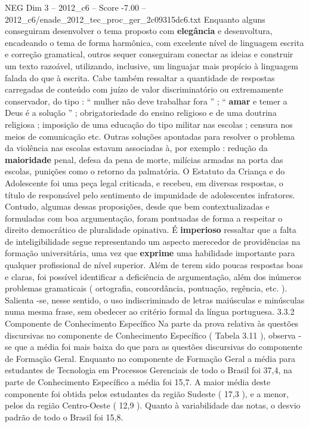 \begin{textsample}{NEG Dim 3 – 2012\_c6 – Score -7.00 – 2012\_c6/enade\_2012\_tec\_proc\_ger\_2c09315dc6.txt}
Enquanto alguns conseguiram desenvolver o tema proposto com \textbf{elegância} e desenvoltura, encadeando o tema de forma harmônica, com excelente nível de linguagem escrita e correção gramatical, outros sequer conseguiram conectar as ideias e construir um texto razoável, utilizando, inclusive, um linguajar mais propício à linguagem falada do que à escrita.
Cabe também ressaltar a quantidade de respostas carregadas de conteúdo com juízo de valor discriminatório ou extremamente conservador, do tipo : “ mulher não deve trabalhar fora ” ; “ \textbf{amar} e temer a Deus é a solução ” ; obrigatoriedade do ensino religioso e de uma doutrina religiosa ; imposição de uma educação do tipo militar nas escolas ; censura nos meios de comunicação etc.
Outras soluções apontadas para resolver o problema da violência nas escolas estavam associadas à, por exemplo : redução da \textbf{maioridade} penal, defesa da pena de morte, milícias armadas na porta das escolas, punições como o retorno da palmatória.
O Estatuto da Criança e do Adolescente foi uma peça legal criticada, e recebeu, em diversas respostas, o título de responsável pelo sentimento de impunidade de adolescentes infratores.
Contudo, algumas dessas proposições, desde que bem contextualizadas e formuladas com boa argumentação, foram pontuadas de forma a respeitar o direito democrático de pluralidade opinativa.
É \textbf{imperioso} ressaltar que a falta de inteligibilidade segue representando um aspecto merecedor de providências na formação universitária, uma vez que \textbf{exprime} uma habilidade importante para qualquer profissional de nível superior.
Além de terem sido poucas respostas boas e claras, foi possível identificar a deficiência de argumentação, além dos inúmeros problemas gramaticais ( ortografia, concordância, pontuação, regência, etc. ).
Salienta -se, nesse sentido, o uso indiscriminado de letras maiúsculas e minúsculas numa mesma frase, sem obedecer ao critério formal da língua portuguesa. 3.3.2 Componente de Conhecimento Específico Na parte da prova relativa às questões discursivas no componente de Conhecimento Específico ( Tabela 3.11 ), observa -se que a média foi mais baixa do que para as questões discursivas do componente de Formação Geral.
Enquanto no componente de Formação Geral a média para estudantes de Tecnologia em Processos Gerenciais de todo o Brasil foi 37,4, na parte de Conhecimento Específico a média foi 15,7.
A maior média deste componente foi obtida pelos estudantes da região Sudeste ( 17,3 ), e a menor, pelos da região Centro-Oeste ( 12,9 ).
Quanto à variabilidade das notas, o desvio padrão de todo o Brasil foi 15,8.

\end{textsample}
